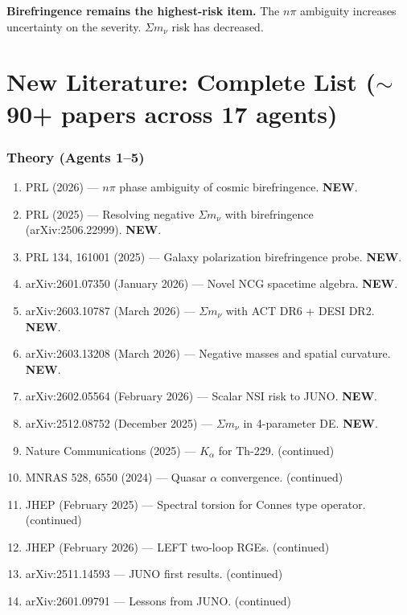 \documentclass[11pt,a4paper]{article}
\newcommand{\NEW}{\textcolor{dfdblue}{\textbf{NEW}}}
\begin{document}
\textbf{Birefringence remains the highest-risk item.} The $n\pi$ ambiguity increases uncertainty on the severity. $\Sigma m_\nu$ risk has decreased.


\part{New Literature: Complete List ($\sim$90+ papers across 17 agents)}

\section{Theory (Agents 1--5)}

\begin{enumerate}
\item PRL (2026) --- $n\pi$ phase ambiguity of cosmic birefringence. \NEW.
\item PRL (2025) --- Resolving negative $\Sigma m_\nu$ with birefringence (arXiv:2506.22999). \NEW.
\item PRL 134, 161001 (2025) --- Galaxy polarization birefringence probe. \NEW.
\item arXiv:2601.07350 (January 2026) --- Novel NCG spacetime algebra. \NEW.
\item arXiv:2603.10787 (March 2026) --- $\Sigma m_\nu$ with ACT DR6 + DESI DR2. \NEW.
\item arXiv:2603.13208 (March 2026) --- Negative masses and spatial curvature. \NEW.
\item arXiv:2602.05564 (February 2026) --- Scalar NSI risk to JUNO. \NEW.
\item arXiv:2512.08752 (December 2025) --- $\Sigma m_\nu$ in 4-parameter DE. \NEW.
\item Nature Communications (2025) --- $K_\alpha$ for Th-229. (continued)
\item MNRAS 528, 6550 (2024) --- Quasar $\alpha$ convergence. (continued)
\item JHEP (February 2025) --- Spectral torsion for Connes type operator. (continued)
\item JHEP (February 2026) --- LEFT two-loop RGEs. (continued)
\item arXiv:2511.14593 --- JUNO first results. (continued)
\item arXiv:2601.09791 --- Lessons from JUNO. (continued)
\end{enumerate}
\end{document}
